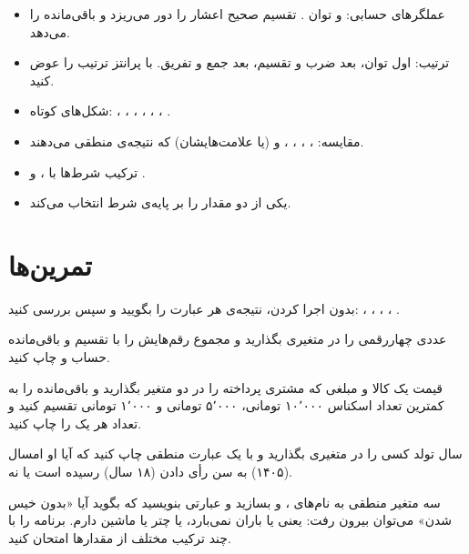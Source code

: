 \begin{summary}
\begin{itemize}
  \item عملگرهای حسابی: \code{+ - * / \%} و توان
        \code{**}. تقسیم صحیح اعشار را
        دور می‌ریزد و \code{\%} باقی‌مانده را می‌دهد.
  \item ترتیب: اول توان، بعد ضرب و تقسیم، بعد جمع و تفریق. با پرانتز
        ترتیب را عوض کنید.
  \item شکل‌های کوتاه: \code{+=}، \code{-=}، \code{*=}، \code{/=}،
        \code{\%=}، \code{++}، \code{--}.
  \item مقایسه: ، ، ،
        ،  و  (یا
        علامت‌هایشان) که نتیجه‌ی منطقی می‌دهند.
  \item ترکیب شرط‌ها با ،  و .
  \item {} یکی از دو مقدار را بر پایه‌ی شرط انتخاب
        می‌کند.
\end{itemize}
\end{summary}

\section*{تمرین‌ها}

\exercise بدون اجرا کردن، نتیجه‌ی هر عبارت را بگویید و سپس بررسی کنید:
، ، ، ،
.

\exercise عددی چهاررقمی را در متغیری بگذارید و مجموع رقم‌هایش را با تقسیم
و باقی‌مانده حساب و چاپ کنید.

\exercise قیمت یک کالا و مبلغی که مشتری پرداخته را در دو متغیر بگذارید و
باقی‌مانده را به کمترین تعداد اسکناس ۱۰٬۰۰۰ تومانی، ۵٬۰۰۰ تومانی و
۱٬۰۰۰ تومانی تقسیم کنید و تعداد هر یک را چاپ کنید.

\exercise سال تولد کسی را در متغیری بگذارید و با یک عبارت منطقی چاپ کنید
که آیا او امسال (۱۴۰۵) به سن رأی دادن (۱۸ سال) رسیده است یا نه.

\exercise سه متغیر منطقی به نام‌های ،
 و  بسازید و عبارتی بنویسید که بگوید
آیا «بدون خیس شدن» می‌توان بیرون رفت: یعنی یا باران نمی‌بارد، یا چتر یا
ماشین دارم. برنامه را با چند ترکیب مختلف از مقدارها امتحان کنید.
